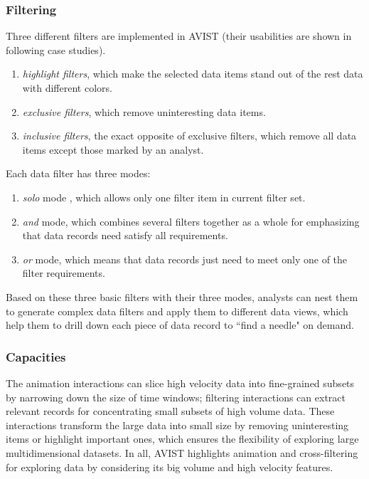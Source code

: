 	\subsubsection{Filtering}
	Three different filters are implemented in AVIST (their usabilities are shown in following case studies).
	\begin{enumerate}[noitemsep]
		\item \emph{highlight filters}, which make the selected data items stand out of the rest data with different colors.
		\item \emph{exclusive filters}, which remove uninteresting data  items.
		\item \emph{inclusive filters}, the exact opposite of exclusive filters, which remove all data items except those marked by an analyst.
	\end{enumerate}
	Each data filter has three modes: 
	\begin{enumerate}[noitemsep]
		 \item \emph{solo} mode , which allows only one filter item in current filter set.
		 \item \emph{and} mode, which combines several filters together as a whole for emphasizing that data records need satisfy all requirements.
		 \item \emph{or} mode, which means that data records just need to meet only one of the filter requirements.
	\end{enumerate}
	 Based on these three basic filters with their three modes, analysts can nest them to generate complex data filters and apply them to different data views,  which help them to drill down each piece of data record to ``find a needle"  on demand. %


	\subsubsection{Capacities}
The animation interactions can slice  high velocity data into fine-grained subsets by narrowing down the size of time windows; filtering interactions can extract relevant records for concentrating small subsets of high volume data. These interactions transform the large data into small size by removing uninteresting items or highlight important ones, which ensures the flexibility of exploring large multidimensional datasets. In all, AVIST highlights animation and cross-filtering for exploring data by considering its big volume and high velocity features.







